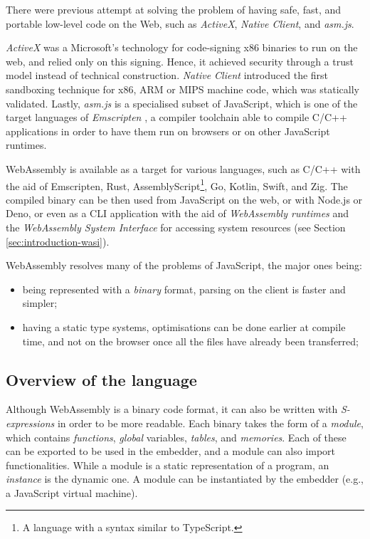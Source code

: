 There were previous attempt at solving the problem of having safe, fast, and portable low-level code on the Web,
such as \textit{ActiveX}, \textit{Native Client}, and \textit{asm.js}.

\textit{ActiveX} \cite{activex} was a Microsoft's technology for code-signing x86 binaries to run on the web, and relied only
on this signing. Hence, it achieved security through a trust model instead of technical construction.
\textit{Native Client} \cite{native-client} introduced the first sandboxing technique for x86, ARM or MIPS machine code,
which was statically validated. Lastly, \textit{asm.js} \cite{asmjs} is a specialised subset of JavaScript, which is one of the target
languages of \textit{Emscripten} \cite{emscripten}, a compiler toolchain able to compile C/C++ applications in order to have them
run on browsers or on other JavaScript runtimes.

WebAssembly is available as a target for various languages, such as C/C++ with the aid of Emscripten, Rust,
AssemblyScript\footnote{A language with a syntax similar to TypeScript.}, Go, Kotlin, Swift, and Zig.
The compiled binary can be then used from JavaScript on the web, or with Node.js or Deno, or even as a CLI application
with the aid of \textit{WebAssembly runtimes} and the \textit{WebAssembly System Interface}
for accessing system resources (see Section \ref*{sec:introduction-wasi}).

WebAssembly resolves many of the problems of JavaScript, the major ones being:
\begin{itemize}
  \item being represented with a \textit{binary} format, parsing on the client is faster and simpler;
  \item having a static type systems, optimisations can be done earlier at compile time, and not on the browser once all the files
        have already been transferred;
\end{itemize}

\subsection{Overview of the language}

Although WebAssembly is a binary code format, it can also be written with \textit{S-expressions}
in order to be more readable.
Each binary takes the form of a \textit{module}, which contains \textit{functions}, \textit{global} variables,
\textit{tables}, and \textit{memories}. Each of these can be exported to be used in the embedder, and a module can also import functionalities.
While a module is a static representation of a program, an \textit{instance} is the dynamic one.
A module can be instantiated by the embedder (e.g., a JavaScript virtual machine).

